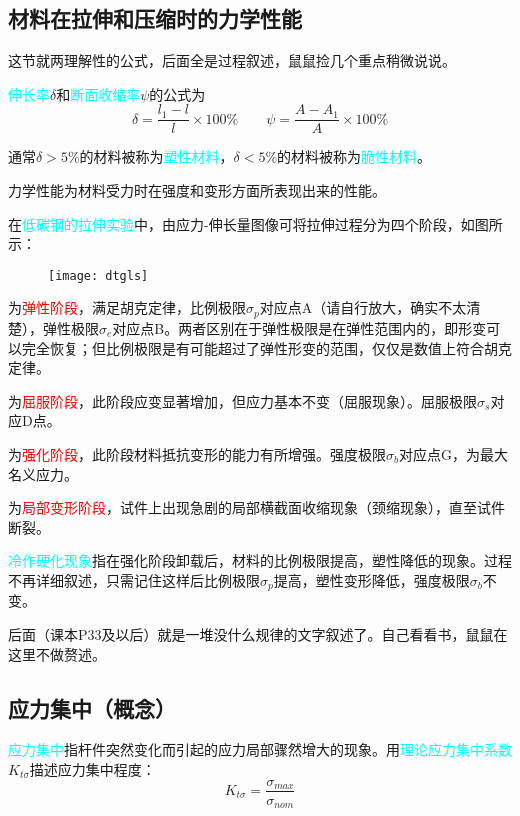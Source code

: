 \documentclass[10pt,a4paper]{ctexart}
\begin{document}
\subsection{材料在拉伸和压缩时的力学性能}
这节就两理解性的公式，后面全是过程叙述，鼠鼠捡几个重点稍微说说。

\textcolor{cyan}{伸长率}$\delta$和\textcolor{cyan}{断面收缩率}$\psi$的公式为
\begin{equation}
	\delta=\frac{l_1-l}{l}\times 100\% \qquad \psi=\frac{A-A_1}{A}\times 100\%
\end{equation}

通常$\delta>5\%$的材料被称为\textcolor{cyan}{塑性材料}，$\delta<5\%$的材料被称为\textcolor{cyan}{脆性材料}。

力学性能为材料受力时在强度和变形方面所表现出来的性能。

在\textcolor{cyan}{低碳钢的拉伸实验}中，由应力-伸长量图像可将拉伸过程分为四个阶段，如图所示：
\begin{figure}[htp]%
	\centering
	\texttt{[image: dtgls]}
\end{figure}

\uppercase\expandafter{}为\textcolor{red}{弹性阶段}，满足胡克定律，比例极限$\sigma_p$对应点A（请自行放大，确实不太清楚），弹性极限$\sigma_e$对应点B。两者区别在于弹性极限是在弹性范围内的，即形变可以完全恢复；但比例极限是有可能超过了弹性形变的范围，仅仅是数值上符合胡克定律\cite{匿名用户2017}。

\uppercase\expandafter{}为\textcolor{red}{屈服阶段}，此阶段应变显著增加，但应力基本不变（屈服现象）。屈服极限$\sigma_s$对应D点。

\uppercase\expandafter{}为\textcolor{red}{强化阶段}，此阶段材料抵抗变形的能力有所增强。强度极限$\sigma_b$对应点G，为最大名义应力。

\uppercase\expandafter{}为\textcolor{red}{局部变形阶段}，试件上出现急剧的局部横截面收缩现象（颈缩现象），直至试件断裂。

\textcolor{cyan}{冷作硬化现象}指在强化阶段卸载后，材料的比例极限提高，塑性降低的现象。过程不再详细叙述，只需记住这样后比例极限$\sigma_p$提高，塑性变形降低，强度极限$\sigma_b$不变。

后面（课本P33及以后）就是一堆没什么规律的文字叙述了。自己看看书，鼠鼠在这里不做赘述。

\subsection{应力集中（概念）}
\textcolor{cyan}{应力集中}指杆件突然变化而引起的应力局部骤然增大的现象。用\textcolor{cyan}{理论应力集中系数}$K_{t\sigma}$描述应力集中程度：
\begin{equation}
	K_{t\sigma}=\frac{\sigma_{max}}{\sigma_{nom}}
\end{equation}
\end{document}
